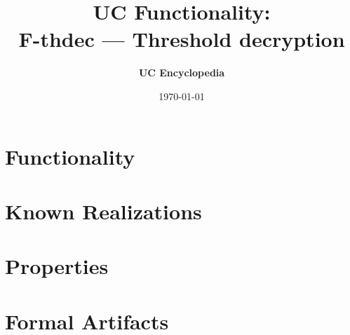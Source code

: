 \documentclass[11pt,a4paper]{article}
\title{\textbf{\Large UC Functionality:}\\[0.2em] \Large F-thdec --- Threshold decryption}
\author{\textbf{UC Encyclopedia}}
\date{\today}
\newtheorem{functionality}{Functionality}
\begin{document}
\maketitle

\begin{abstract}
\end{abstract}

\section{Functionality}

%

\section{Known Realizations}


\section{Properties}


\section{Formal Artifacts}

\end{document}
